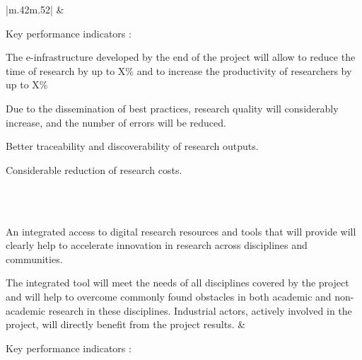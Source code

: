 \begin{supertabular}{|m{.42\textwidth}m{.52\textwidth}|}
 &

  Key performance indicators :
  \begin{compactenum}
\item The e-infrastructure developed by the end of the project will allow to reduce
the time of research by up to X\% and to increase the productivity of researchers by 
up to X\%
\item Due to the dissemination of best practices, research quality will considerably 
increase, and the number of errors will be reduced.
\item Better traceability and discoverability of research outputs.
\item Considerable reduction of research costs.
\end{compactenum}

\\\hline
\hline{}\\\hline

An integrated access to digital research
resources and tools that \TheProject will provide will clearly help to
accelerate innovation in research across disciplines and communities.

The integrated tool will meet the needs of all disciplines covered by
the project and will help to overcome commonly found obstacles in
both academic and non-academic research in these disciplines. Industrial
actors, actively involved in the project, will directly benefit from
the project results. &

Key performance indicators :


\end{supertabular}
